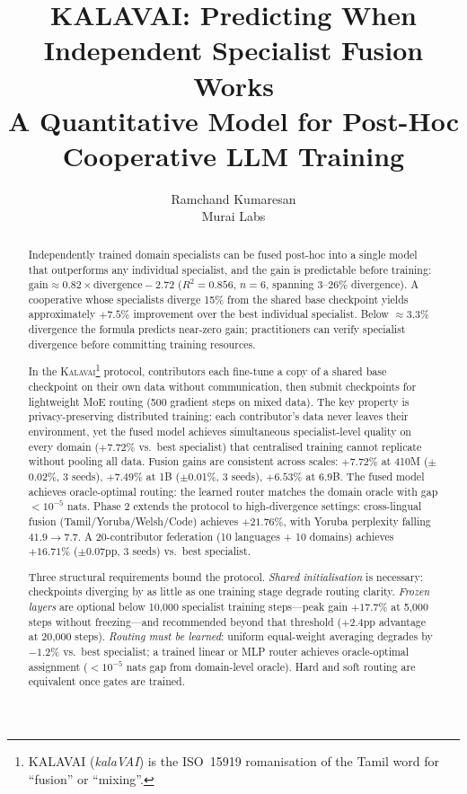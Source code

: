 \documentclass{article}
\title{KALAVAI: Predicting When Independent Specialist Fusion Works\\
       A Quantitative Model for Post-Hoc Cooperative LLM Training}
\author{%
  Ramchand Kumaresan \\
  Murai Labs
}
\newcommand{\kalavai}{\textsc{Kalavai}\xspace}
\begin{document}
\maketitle

\begin{abstract}
Independently trained domain specialists can be fused post-hoc into a single model that outperforms any individual specialist, and the gain is predictable before training:
$\text{gain} \approx 0.82 \times \text{divergence} - 2.72$ ($R^2 = 0.856$, $n=6$, spanning 3--26\% divergence).
A cooperative whose specialists diverge 15\% from the shared base checkpoint yields approximately $+7.5\%$ improvement over the best individual specialist.
Below $\approx$3.3\% divergence the formula predicts near-zero gain; practitioners can verify specialist divergence before committing training resources.

In the \kalavai\footnote{KALAVAI (\textit{kalaVAI}) is the ISO~15919 romanisation of the Tamil word for ``fusion'' or ``mixing''.} protocol, contributors each fine-tune a copy of a shared base checkpoint on their own data without communication, then submit checkpoints for lightweight MoE routing (500 gradient steps on mixed data).
The key property is privacy-preserving distributed training: each contributor's data never leaves their environment, yet the fused model achieves simultaneous specialist-level quality on every domain ($+7.72\%$ vs.\ best specialist) that centralised training cannot replicate without pooling all data.
Fusion gains are consistent across scales: $+7.72\%$ at 410M ($\pm$0.02\%, 3 seeds), $+7.49\%$ at 1B ($\pm$0.01\%, 3 seeds), $+6.53\%$ at 6.9B.
The fused model achieves oracle-optimal routing: the learned router matches the domain oracle with gap $<10^{-5}$ nats.
Phase 2 extends the protocol to high-divergence settings: cross-lingual fusion (Tamil/Yoruba/Welsh/Code) achieves $+21.76\%$, with Yoruba perplexity falling $41.9\to7.7$.
A 20-contributor federation (10 languages + 10 domains) achieves $+16.71\%$ ($\pm$0.07pp, 3 seeds) vs.\ best specialist.

Three structural requirements bound the protocol. \emph{Shared initialisation} is necessary: checkpoints diverging by as little as one training stage degrade routing clarity. \emph{Frozen layers} are optional below 10,000 specialist training steps---peak gain $+17.7\%$ at 5,000 steps without freezing---and recommended beyond that threshold ($+2.4$pp advantage at 20,000 steps). \emph{Routing must be learned}: uniform equal-weight averaging degrades by $-1.2\%$ vs.\ best specialist; a trained linear or MLP router achieves oracle-optimal assignment ($<10^{-5}$ nats gap from domain-level oracle). Hard and soft routing are equivalent once gates are trained.
\end{abstract}
\end{document}
